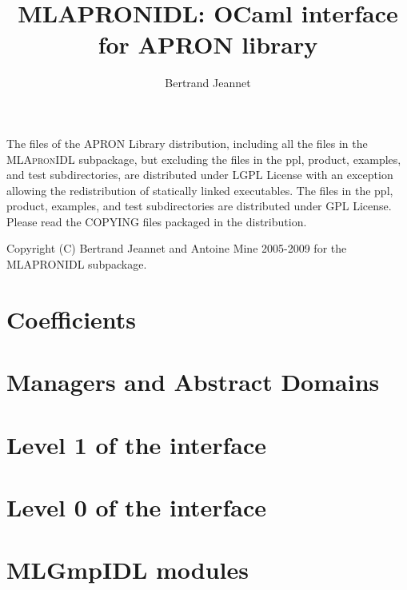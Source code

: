 \documentclass[twoside,10pt,a4paper]{report}
\title{MLAPRONIDL: OCaml interface for APRON library}
\author{Bertrand Jeannet}
\begin{document}
\maketitle

\vspace*{0.9\textheight}

The files of the APRON Library distribution, including all the files in the \textsc{MLApronIDL} subpackage, but excluding the files in the ppl, product, examples, and test subdirectories, are distributed under LGPL License with an exception allowing the redistribution of statically linked executables.
The files in the ppl, product, examples, and test subdirectories are distributed under GPL License.
Please read the COPYING files packaged in the distribution.

Copyright (C) Bertrand Jeannet and Antoine Mine 2005-2009 for the
\textsc{MLAPRONIDL} subpackage.

\newpage

\tableofcontents



\part{Coefficients}




\part{Managers and Abstract Domains}







\part{Level 1 of the interface}










\part{Level 0 of the interface}








\part{MLGmpIDL modules}









\appendix
\printindex
\end{document}
